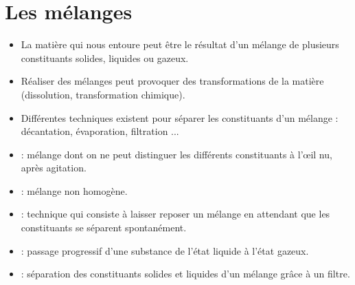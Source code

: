 \documentclass[12pt,a4paper]{article}
\begin{document}
\newpage

\section{Les mélanges}

\begin{mybilan}
	\begin{itemize}
	\item La matière qui nous entoure peut être le résultat d'un mélange de plusieurs constituants solides, liquides ou gazeux.
		
	\item Réaliser des mélanges peut provoquer des transformations de la matière (dissolution, transformation chimique).
	
	\item Différentes techniques existent pour séparer les constituants d'un mélange : décantation, évaporation, filtration ...
\end{itemize}
\end{mybilan}

\begin{mydefs}
	\begin{itemize}
		\item {} : mélange dont on ne peut distinguer les différents constituants à l'\oe il nu, après agitation.
		
		\item {} : mélange non homogène.
		
		\item {} :  technique qui consiste à laisser reposer un mélange en attendant que les constituants se séparent spontanément.
		
		\item {} : passage progressif d'une substance de l'état liquide à l'état gazeux.
		
		\item {} : séparation des constituants solides et liquides d'un mélange grâce à un filtre.
	\end{itemize}
\end{mydefs}
\end{document}
